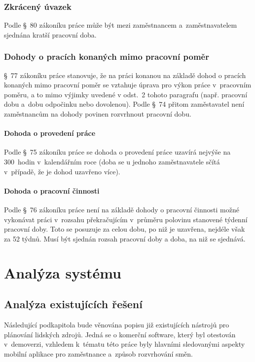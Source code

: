 \documentclass[twoside]{ctuthesis}
\begin{document}
\subsection{Zkrácený úvazek}
Podle §~80 zákoníku práce může být mezi zaměstnancem a~zaměstnavatelem sjednána kratší pracovní doba.

\subsection{Dohody o pracích konaných mimo pracovní poměr}
§~77 zákoníku práce stanovuje, že na práci konanou na základě dohod o pracích konaných mimo pracovní poměr se vztahuje úprava pro výkon práce v~pracovním poměru, a to mimo výjimky uvedené v odst.~2 tohoto paragrafu (např. pracovní dobu a~dobu odpočinku nebo dovolenou). Podle §~74 přitom zaměstavatel není zaměstnancům na dohody povinen rozvrhnout pracovní dobu.

\subsubsection{Dohoda o provedení práce}
Podle §~75 zákoníku práce se dohoda o provedení práce uzavírá nejvýše na 300~hodin v~kalendářním roce (doba se u jednoho zaměstnavatele sčítá v~případě, že je dohod uzavřeno více).

\subsubsection{Dohoda o pracovní činnosti}
Podle §~76 zákoníku práce není na základě dohody o pracovní činnosti možné vykonávat práci v~rozsahu překračujícím v~průměru polovinu stanovené týdenní pracovní doby. Toto se posuzuje za celou dobu, po niž je uzavřena, nejdéle však za 52 týdnů. Musí být sjednán rozsah pracovní doby a doba, na niž se sjednává.


\chapter{Analýza systému}

\section{Analýza existujících řešení}
\label{sec:existing}
Následující podkapitola bude věnována popisu již existujících nástrojů pro plánování lidských zdrojů. Jedná se o komerční software, který byl otestován v~demoverzi, vzhledem k~tématu této práce byly hlavními sledovanými aspekty mobilní aplikace pro zaměstnance a~způsob rozvrhování směn.
\end{document}
